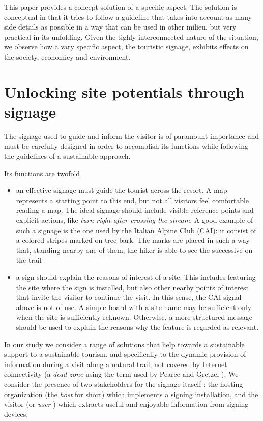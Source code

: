\documentclass[sustainability,article,submit,pdftex,moreauthors]{Definitions/mdpi}
\begin{document}
This paper provides a concept solution of a specific aspect. The solution is conceptual in that it tries to follow a guideline that takes into account as many side details as possible in a way that can be used in other milieu, but very practical in its unfolding. Given the tighly interconnected nature of the situation, we observe how a vary specific aspect, the touristic signage, exhibits effects on the society, economicy and environment.

\section{Unlocking site potentials through signage}

The signage used to guide and inform the visitor is of paramount importance and must be carefully designed in order to accomplish its functions while following the guidelines of a sustainable approach.

Its functions are twofold
\begin {itemize}
\item an effective signage must guide the tourist across the resort. A map represents a starting point to this end, but not all visitors feel comfortable reading a map. The ideal signage should include visible reference points and explicit actions, like {\em turn right after crossing the stream}. A good example of such a signage is the one used by the Italian Alpine Club (CAI): it consist of a colored stripes marked on tree bark. The marks are placed in such a way that, standing nearby one of them, the hiker is able to see the successive on the trail
\item a sign should explain the reasons of interest of a site. This includes featuring the site where the sign is installed, but also other nearby points of interest that invite the visitor to continue the visit. In this sense, the CAI signal above is not of use. A simple board with a site name may be sufficient only when the site is sufficiently reknown. Otherwise, a more structured message should be used to explain the reasons why the feature is regarded as relevant.
\end{itemize}

In our study we consider a range of solutions that help towards a sustainable support to a sustainable tourism, and specifically to the dynamic provision of information during a visit along a natural trail, not covered by Internet connectivity (a {\em dead zone} using the term used by Pearce and Gretzel \cite{pea12a}). We consider the presence of two stakeholders for the signage itaself \cite{wan22a}: the hosting organization (the {\em host} for short) which implements a signing installation, and the visitor (or {\em user} ) which extracts useful and enjoyable information from signing devices. 
\end{document}
